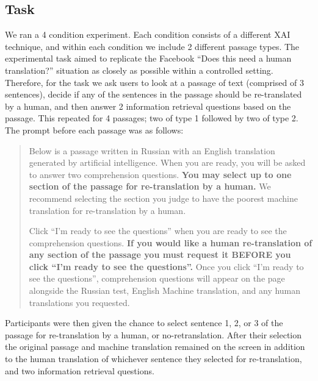 \subsection{Task} 
We ran a 4 condition experiment. Each condition consists of a different XAI technique, and within each condition we include 2 different passage types. The experimental task aimed to replicate the Facebook “Does this need a human translation?” situation as closely as possible within a controlled setting. Therefore, for the task we ask users to look at a passage of text (comprised of 3 sentences), decide if any of the sentences in the passage should be re-translated by a human, and then answer 2 information retrieval questions based on the passage. This repeated for 4 passages; two of type 1 followed by two of type 2. The prompt before each passage was as follows:

\begin{quote}
Below is a passage written in Russian with an English translation generated by artificial intelligence. When you are ready, you will be asked to answer two comprehension questions. \textbf{You may select up to one section of the passage for re-translation by a human.} We recommend selecting the section you judge to have the poorest machine translation for re-translation by a human. 

Click ``I’m ready to see the questions'' when you are ready to see the comprehension questions. \textbf{If you would like a human re-translation of any section of the passage you must request it BEFORE you click ``I’m ready to see the questions''.} Once you click ``I’m ready to see the questions'', comprehension questions will appear on the page alongside the Russian test, English Machine translation, and any human translations you requested.  
\end{quote}

Participants were then given the chance to select sentence 1, 2, or 3 of the passage for re-translation by a human, or no-retranslation. After their selection the original passage and machine translation remained on the screen in addition to the human translation of whichever sentence they selected for re-translation, and two information retrieval questions.  

